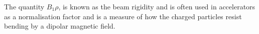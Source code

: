 The quantity $B_1 \rho$, is known as the beam rigidity and is often used in accelerators as a normalisation factor and is a measure of how the charged particles resist bending by a dipolar magnetic field. %














